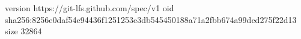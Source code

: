 version https://git-lfs.github.com/spec/v1
oid sha256:8256e0daf54e94436f1251253e3db545450188a71a2fbb674a99dcd275f22d13
size 32864
